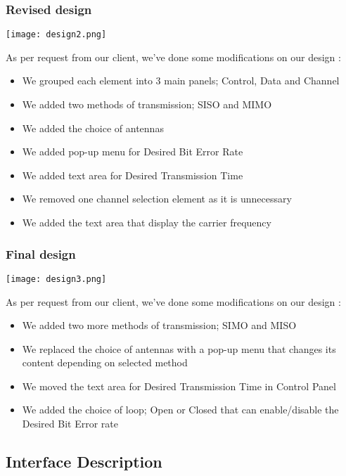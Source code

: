 \documentclass[12pt,a4paper]{article}
\begin{document}
\subsubsection{Revised design}
\begin{center}
\texttt{[image: design2.png]}
\end{center}
\par As per request from our client, we've done some modifications on our design :
\begin{itemize}
	\item We grouped each element into 3 main panels; Control, Data and Channel
	\item We added two methods of transmission; SISO and MIMO
	\item We added the choice of antennas
	\item We added pop-up menu for Desired Bit Error Rate
	\item We added text area for Desired Transmission Time
	\item We removed one channel selection element as it is unnecessary
	\item We added the text area that display the carrier frequency
\end{itemize}

\subsubsection{Final design}
\begin{center}
\texttt{[image: design3.png]}
\end{center}
\par As per request from our client, we've done some modifications on our design :
\begin{itemize}
	\item We added two more methods of transmission; SIMO and MISO
	\item We replaced the choice of antennas with a pop-up menu that changes its content depending on selected method
	\item We moved the text area for Desired Transmission Time in Control Panel
	\item We added the choice of loop; Open or Closed that can enable/disable the Desired Bit Error rate
\end{itemize}

\subsection{Interface Description}
\end{document}
